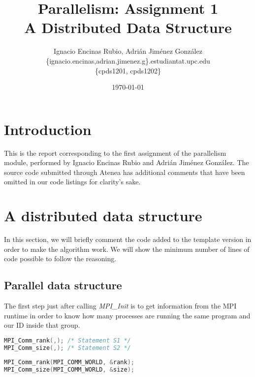 \documentclass[a4paper, 10pt]{article}
\title{\textbf{Parallelism: Assignment 1\\A Distributed Data Structure}}
\author{Ignacio Encinas Rubio, Adrián Jiménez González\\\{ignacio.encinas,adrian.jimenez.g\}.estudiantat.upc.edu\\\{cpds1201, cpds1202\}}
\date{\normalsize\today{}}
\begin{document}
\maketitle

  
  

\section{Introduction}

This is the report corresponding to the first assignment of the parallelism module, performed by Ignacio Encinas Rubio and Adrián Jiménez González. The source code submitted through Atenea has additional comments that have been omitted in our code listings for clarity's sake.


\section{A distributed data structure}

   In this section, we will briefly comment the code added to the template version in order to
   make the algorithm work. We will show the minimum number of lines of code possible to follow the reasoning.

\subsection{Parallel data structure}


    The first step just after calling \textit{MPI\_Init} is to get information from the MPI runtime in order to know how many processes are running the same program and our ID inside that group. 

    \begin{minipage}{.45\textwidth}
	\begin{lstlisting}[language=c, caption={Template S1, S2}]
MPI_Comm_rank(,); /* Statement S1 */
MPI_Comm_size(,); /* Statement S2 */
	\end{lstlisting}
    \end{minipage}\hfill
    \begin{minipage}{.45\textwidth}
	\begin{lstlisting}[language=c, caption={Correct S1, S2}]
MPI_Comm_rank(MPI_COMM_WORLD, &rank); 
MPI_Comm_size(MPI_COMM_WORLD, &size); 
	\end{lstlisting}
    \end{minipage}
\end{document}
